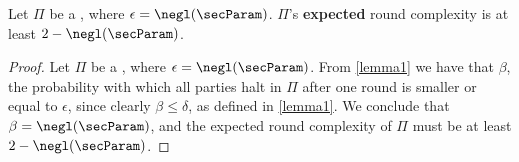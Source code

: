 \begin{corollary}\label{cor1}
Let $\Pi$ be a , where $\epsilon = \negl(\secParam)$. $\Pi$'s \textbf{expected} round complexity is at least $2 - \negl(\secParam)$.
\end{corollary}

\begin{proof}
Let $\Pi$ be a , where $\epsilon = \negl(\secParam)$. From \cref{lemma1} we have that $\beta$, the probability with which all parties halt in $\Pi$ after one round is smaller or equal to $\epsilon$, since clearly $\beta \leq \delta$, as defined in \cref{lemma1}. We conclude that $\beta = \negl(\secParam)$, and the expected round complexity of $\Pi$ must be at least $2 - \negl(\secParam)$.
\end{proof}

